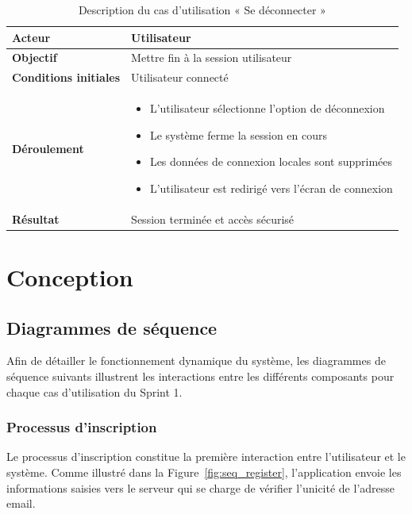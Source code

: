 \begin{table}[H]
\centering
\renewcommand{\arraystretch}{1.2}
\begin{tabular}{|p{4cm}|p{10cm}|}
\hline
\textbf{Acteur} & Utilisateur \\ \hline

\textbf{Objectif} & Mettre fin à la session utilisateur \\ \hline

\textbf{Conditions initiales} & Utilisateur connecté \\ \hline

\textbf{Déroulement} &
\begin{itemize}
    \item L’utilisateur sélectionne l’option de déconnexion
    \item Le système ferme la session en cours
    \item Les données de connexion locales sont supprimées
    \item L’utilisateur est redirigé vers l’écran de connexion
\end{itemize} \\ \hline

\textbf{Résultat} & Session terminée et accès sécurisé \\ \hline
\end{tabular}
\caption{Description du cas d’utilisation « Se déconnecter »}
\label{tab:uc_logout}
\end{table}

\section{Conception}
\subsection{Diagrammes de séquence}

Afin de détailler le fonctionnement dynamique du système, les diagrammes de séquence suivants illustrent les interactions entre les différents composants pour chaque cas d’utilisation du Sprint 1.

\subsubsection{Processus d’inscription}

Le processus d’inscription constitue la première interaction entre l’utilisateur et le système. Comme illustré dans la Figure~\ref{fig:seq_register}, l’application envoie les informations saisies vers le serveur qui se charge de vérifier l’unicité de l’adresse email. 

